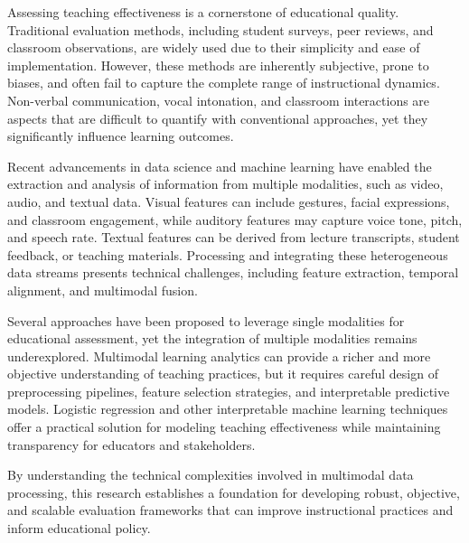 Assessing teaching effectiveness is a cornerstone of educational quality. Traditional evaluation methods, including student surveys, peer reviews, and classroom observations, are widely used due to their simplicity and ease of implementation. However, these methods are inherently subjective, prone to biases, and often fail to capture the complete range of instructional dynamics. Non-verbal communication, vocal intonation, and classroom interactions are aspects that are difficult to quantify with conventional approaches, yet they significantly influence learning outcomes.

Recent advancements in data science and machine learning have enabled the extraction and analysis of information from multiple modalities, such as video, audio, and textual data. Visual features can include gestures, facial expressions, and classroom engagement, while auditory features may capture voice tone, pitch, and speech rate. Textual features can be derived from lecture transcripts, student feedback, or teaching materials. Processing and integrating these heterogeneous data streams presents technical challenges, including feature extraction, temporal alignment, and multimodal fusion.

Several approaches have been proposed to leverage single modalities for educational assessment, yet the integration of multiple modalities remains underexplored. Multimodal learning analytics can provide a richer and more objective understanding of teaching practices, but it requires careful design of preprocessing pipelines, feature selection strategies, and interpretable predictive models. Logistic regression and other interpretable machine learning techniques offer a practical solution for modeling teaching effectiveness while maintaining transparency for educators and stakeholders.

By understanding the technical complexities involved in multimodal data processing, this research establishes a foundation for developing robust, objective, and scalable evaluation frameworks that can improve instructional practices and inform educational policy.
